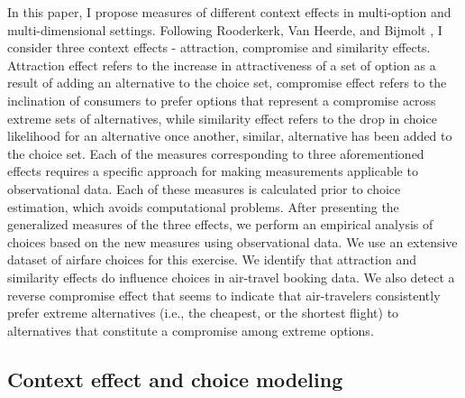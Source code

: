 \documentclass[a4paper,12pt]{article}
\newcommand{\citeyearonly}[1]{\citeyearpar{#1}}
\begin{document}
In this paper, I propose measures of different context effects in multi-option and multi-dimensional settings. Following Rooderkerk, Van Heerde, and Bijmolt \citeyearonly{roodrkerkEtAl11}, I consider three context effects - attraction, compromise and similarity effects. Attraction effect refers to the increase in attractiveness of a set of option as a result of adding an alternative to the choice set, compromise effect refers to the inclination of consumers to prefer options that represent a compromise across extreme sets of alternatives, while similarity effect refers to the drop in choice likelihood for an alternative once another, similar, alternative has been added to the choice set. Each of the measures corresponding to three aforementioned effects requires a specific approach for making measurements applicable to observational data. Each of these measures is calculated prior to choice estimation, which avoids computational problems. After presenting the generalized measures of the three effects, we perform an empirical analysis of choices based on the new measures using observational data. We use an extensive dataset of airfare choices for this exercise. We identify that attraction and similarity effects do influence choices in air-travel booking data. We also detect a reverse compromise effect that seems to indicate that air-travelers consistently prefer extreme alternatives (i.e., the cheapest, or the shortest flight) to alternatives that constitute a compromise among extreme options.

\subsection{Context effect and choice modeling}
\end{document}
